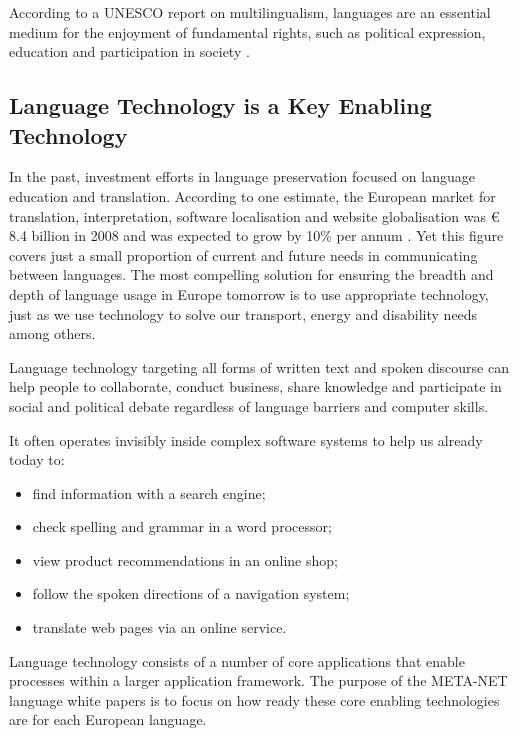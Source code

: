 \begin{multicols}{2}
According to a UNESCO report on multilingualism, languages are an essential medium for the enjoyment of fundamental rights, such as political expression, education and participation in society \cite{Unesco1}.

\subsection{Language Technology is a Key Enabling Technology}

  In the past, investment efforts in language preservation focused on language education and translation. According to one estimate, the  European market for translation, interpretation, software localisation and website globalisation was € 8.4 billion in 2008 and was expected to grow by 10\% per annum \cite{EC3}. Yet this figure covers just a small proportion of current and future needs in communicating between languages. The most compelling solution for ensuring the breadth and depth of language usage in Europe tomorrow is to use appropriate technology, just as we use technology to solve our transport, energy and disability needs among others.

Language technology targeting all forms of written text and spoken discourse can help people to collaborate, conduct business, share knowledge and participate in social and political debate regardless of language barriers and computer skills. 

It often operates invisibly inside complex software systems to help us already today to:

\begin{itemize}
\item find information with a search engine;
\item check spelling and grammar in a word processor;
\item view product recommendations in an online shop;
\item follow the spoken directions of a navigation system;
\item translate web pages via an online service.
\end{itemize}

Language technology consists of a number of core applications that enable processes within a larger application framework. The purpose of the META-NET language white papers is to focus on how ready these core enabling technologies are for each European language. 



\end{multicols}

